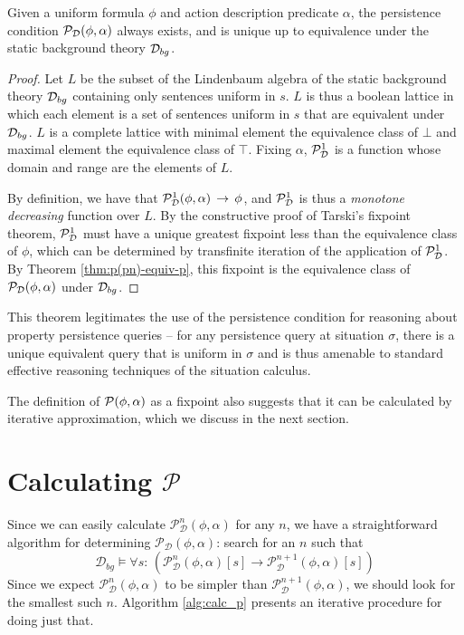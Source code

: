 \begin{thm}
Given a uniform formula $\phi$ and action description predicate $\alpha$,
the persistence condition $\mathcal{P}_{\mathcal{D}}(\phi,\alpha)$ always exists,
and is unique up to equivalence under the static background theory
$\mathcal{D}_{bg}$. \label{thm:p-always-exists} 
\end{thm}
\begin{proof}
Let $L$ be the subset of the Lindenbaum algebra of the static background
theory $\mathcal{D}_{bg}$ containing only sentences uniform in $s$. $L$
is thus a boolean lattice in which each element is a set of sentences
uniform in $s$ that are equivalent under $\mathcal{D}_{bg}$. $L$ is a complete
lattice with minimal element the equivalence class of $\bot$ and
maximal element the equivalence class of $\top$. Fixing $\alpha$,
$\mathcal{P}^{1}_{\mathcal{D}}$ is a function whose domain and range are the elements of
$L$.

By definition, we have that $\mathcal{P}^{1}_{\mathcal{D}}(\phi,\alpha)\,\rightarrow\,\phi$,
and $\mathcal{P}^{1}_{\mathcal{D}}$ is thus a \emph{monotone decreasing} function over $L$.
By the constructive proof of Tarski's fixpoint theorem, $\mathcal{P}^{1}_{\mathcal{D}}$
must have a unique greatest fixpoint less than the equivalence class
of $\phi$, which can be determined by transfinite iteration of the
application of $\mathcal{P}^{1}_{\mathcal{D}}$. By Theorem \ref{thm:p(pn)-equiv-p}, this
fixpoint is the equivalence class of $\mathcal{P}_{\mathcal{D}}(\phi,\alpha)$ under
$\mathcal{D}_{bg}$. 
\end{proof}
This theorem legitimates the use of the persistence condition for
reasoning about property persistence queries -- for any persistence
query at situation $\sigma$, there is a unique equivalent query that
is uniform in $\sigma$ and is thus amenable to standard effective
reasoning techniques of the situation calculus.

The definition of $\mathcal{P}(\phi,\alpha)$ as a fixpoint also suggests
that it can be calculated by iterative approximation, which we discuss
in the next section.


\section{Calculating $\mathcal{P}$\label{sec:Persistence:Calculating}}

Since we can easily calculate $\mathcal{P}_{\mathcal{D}}^{n}(\phi,\alpha)$
for any $n$, we have a straightforward algorithm for determining
$\mathcal{P_{D}}(\phi,\alpha)$: search for an $n$ such that\[
\mathcal{D}_{bg}\models\forall s:\,\left(\mathcal{P}_{\mathcal{D}}^{n}(\phi,\alpha)[s]\rightarrow\mathcal{P}_{\mathcal{D}}^{n+1}(\phi,\alpha)[s]\right)\]
 Since we expect $\mathcal{P}_{\mathcal{D}}^{n}(\phi,\alpha)$ to
be simpler than $\mathcal{P}_{\mathcal{D}}^{n+1}(\phi,\alpha)$, we
should look for the smallest such $n$. Algorithm \ref{alg:calc_p}
presents an iterative procedure for doing just that.

